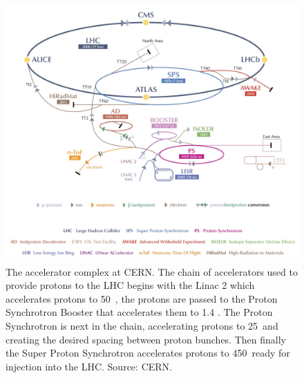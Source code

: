 \begin{figure}[tbp!]
  \centering
  \includegraphics[width=1.0\textwidth]{./Figs/LHC_LHCb/accelerator_complex.jpg}
  \caption{The accelerator complex at CERN. The chain of accelerators used to provide protons to the LHC begins with the Linac 2 which accelerates protons to 50~\mev, the protons are passed to the Proton Synchrotron Booster that accelerates them to 1.4 \gev. The Proton Synchrotron is next in the chain, accelerating protons to 25~\gev and creating the desired spacing between proton bunches. Then finally the Super Proton Synchrotron accelerates protons to 450~\gev ready for injection into the LHC. Source: CERN.}
  \label{fig:accelerator_chain}
\end{figure}




